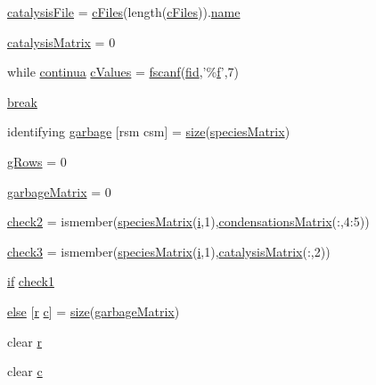 \begin{DoxyCompactItemize}
\item 
\hyperlink{a00021_a33e70cf5b45cb59005b82d30202f0b69}{catalysis\-File} = \hyperlink{a00024_a9eab57ccb42a39c704f47dc30e4f4515}{c\-Files}(length(\hyperlink{a00024_a9eab57ccb42a39c704f47dc30e4f4515}{c\-Files})).\hyperlink{a00021_abbf559a76fab59203496b0847ab9502a}{name}
\item 
\hyperlink{a00021_a0810027f58d6be965e44b7b84c44ace8}{catalysis\-Matrix} = 0
\item 
while \hyperlink{a00024_a9c951ebd5bc3f1adce943bee1255f4d6}{continua} \hyperlink{a00021_ad4ba7701967c1da20171228afccb7081}{c\-Values} = \hyperlink{a00019_a028ac102a731e62fb0a7439381f566c1}{fscanf}(\hyperlink{a00025_ae9011d40c6f13e68e6f07156e0da7c5d}{fid},'\%\hyperlink{a00019_a9c5a71c46b1abb8b7df5ebeac6c81535}{f}',7)
\item 
\hyperlink{a00021_a91cf6fbebedd86150a36e5ac3d5d3bfc}{break}
\item 
identifying \hyperlink{a00021_abe2562f47a009cdc636cec6fe7b1036b}{garbage} \mbox{[}rsm csm\mbox{]} = \hyperlink{a00056_ae113ea7f9e515a12ac4b5595c6faf61e}{size}(\hyperlink{a00021_ab9e70ab48bc489696c53ad7946d9dfd2}{species\-Matrix})
\item 
\hyperlink{a00021_af33e0ef530936979d29418a30cb262d0}{g\-Rows} = 0
\item 
\hyperlink{a00021_a81fbeed23d0dfd3b031fce1839f131fe}{garbage\-Matrix} = 0
\item 
\hyperlink{a00021_a98a8838a85ed24032563a44271b1525a}{check2} = ismember(\hyperlink{a00021_ab9e70ab48bc489696c53ad7946d9dfd2}{species\-Matrix}(\hyperlink{a00065_ad3efca1ea6e3333daf30719ee0501862}{i},1),\hyperlink{a00024_a84a949cdae2c03193c84caf27f855b30}{condensations\-Matrix}(\-:,4\-:5))
\item 
\hyperlink{a00021_adfd17509248a56986475a25ee50fe488}{check3} = ismember(\hyperlink{a00021_ab9e70ab48bc489696c53ad7946d9dfd2}{species\-Matrix}(\hyperlink{a00065_ad3efca1ea6e3333daf30719ee0501862}{i},1),\hyperlink{a00024_a244eec8903103b5bbddef461276286ce}{catalysis\-Matrix}(\-:,2))
\item 
\hyperlink{a00024_a01d55766b8058903dd360b4bda71f9f5}{if} \hyperlink{a00021_a62c10db322670bdabb633eb294c4fcec}{check1}
\item 
\hyperlink{a00021_af5946383720aa572eb93e1e63afc23c2}{else} \mbox{[}\hyperlink{a00025_ac862e7284527eb913b1351c8bfb8e079}{r} \hyperlink{a00029_a6be92348ba85ef257b11d06209e1d7b6}{c}\mbox{]} = \hyperlink{a00056_ae113ea7f9e515a12ac4b5595c6faf61e}{size}(\hyperlink{a00021_acdc35755c8d07d7b7df426e77ae26506}{garbage\-Matrix})
\item 
clear \hyperlink{a00021_ac862e7284527eb913b1351c8bfb8e079}{r}
\item 
clear \hyperlink{a00021_a8e54ca14679a1ce9245a3b7d55d95570}{c}
\end{DoxyCompactItemize}


